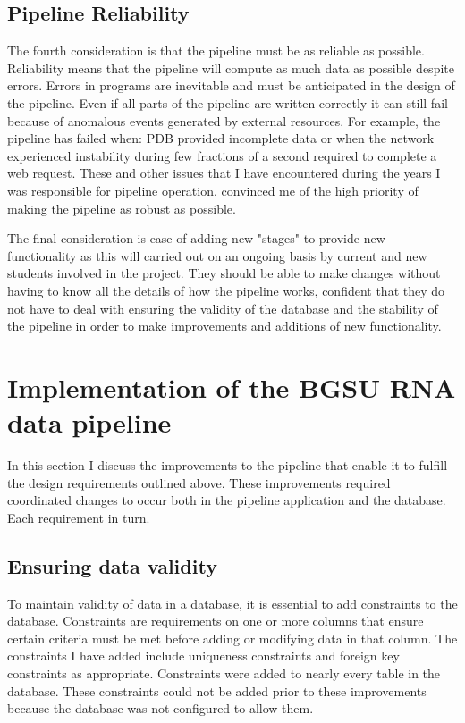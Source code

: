 \subsection{Pipeline Reliability}

The fourth consideration is that the pipeline must be as reliable as possible.
Reliability means that the pipeline will compute as much data as possible
despite errors. Errors in programs are inevitable and must be anticipated in the
design of the pipeline. Even if all parts of the pipeline are written correctly
it can still fail because of anomalous events generated by external resources.
For example, the pipeline has failed when:  PDB provided incomplete data or when
the network experienced instability during few fractions of a second required to
complete a web request. These and other issues that I have encountered during
the years I was responsible for pipeline operation, convinced me of the high
priority of making the pipeline as robust as possible.

The final consideration is ease of adding new "stages" to provide new
functionality as this will carried out on an ongoing basis by current and new
students involved in the project. They should be able to make changes without
having to know all the details of how the pipeline works, confident that they do
not have to deal with ensuring the validity of the database and the stability of
the pipeline in order to make improvements and additions of new functionality.

\section{Implementation of the BGSU RNA data pipeline}

In this section I discuss the improvements to the pipeline that enable it to
fulfill the design requirements outlined above. These improvements required
coordinated changes to occur both in the pipeline application and the database.
Each requirement in turn.

\subsection{Ensuring data validity}

To maintain validity of data in a database, it is essential to add constraints
to the database. Constraints are requirements on one or more columns that ensure
certain criteria must be met before adding or modifying data in that column. The
constraints I have added include uniqueness constraints and foreign key
constraints as appropriate. Constraints were added to  nearly every table in the
database. These constraints could not be added prior to these improvements
because the database was not configured to allow them.

